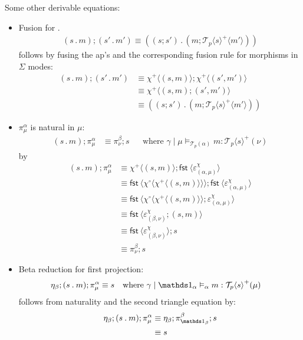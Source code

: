 \documentclass[10pt]{article}
\theoremstyle{definition}
\newcommand\dsd[1]{\ensuremath{\mathsf{#1}}}
\newcommand{\app}[2]{\ensuremath{#1 \: #2}}
\newcommand{\fst}[1]{\app{\dsd{fst}}{#1}}
\newcommand\TermTwoT[5]{\ensuremath{#1 \mid #3 \vDash_{#5} {#2} : #4}}
\newcommand\TrPlus[2]{\ensuremath{{#1}^+(#2)}}
\newcommand\El[2]{\mathcal{T}_{#1}(#2)}
\newcommand\ApEl[2]{\mathcal{T}_{#1}\langle#2\rangle}
\newcommand\bdot[0]{\mathbin{.}}
\newcommand\ap[2]{\ensuremath{#1 \langle #2 \rangle }}
\newcommand\ApPlus[2]{\ensuremath{{#1}^+ \langle #2 \rangle }}
\newcommand\ApCirc[2]{\ensuremath{{#1}^\circ \langle #2 \rangle }}
\begin{document}
Some other derivable equations:
\begin{itemize}
\item Fusion for $.$
\begin{align}
\label{dot-fusion}
    (s \bdot m);(s' \bdot m') \equiv ((s;s') \bdot (m;\ApPlus{\ApEl{p}{s}} {m'}))
\end{align}
follows by fusing the ap's and the corresponding fusion rule for morphisms in $\Sigma$ modes:
\begin{align*}
(s \bdot m);(s' \bdot m') &\equiv \ApPlus{\chi}{(s, m)} ; \ApPlus{\chi}{(s', m')} \\
&\equiv \ApPlus{\chi}{(s, m);(s', m')} \\
&\equiv ((s;s') \bdot (m;\ApPlus{\ApEl{p}{s}} {m'}))
\end{align*}

\item $\pi^\alpha_\mu$ is natural in $\mu$:
  \begin{align}
  \label{pi-naturality}
  (s \bdot m); \pi^\alpha_\mu &\equiv \pi^\beta_\nu;s && \text{where } \TermTwoT{\gamma}{m}{\mu}{\TrPlus{\ApEl{p}{s}}{\nu}}{\El{p}{\alpha}}
  \end{align}
  by
  \begin{align*}
  (s \bdot m); \pi^\alpha_\mu 
  &\equiv \ApPlus{\chi}{(s, m)} ; \ap \fst {\varepsilon^\chi_{(\alpha, \mu)}} \\  
  &\equiv \ap{\fst}{\ApCirc{\chi}{\ApPlus{\chi}{(s, m)}}} ; \ap \fst {\varepsilon^\chi_{(\alpha, \mu)}} \\
  &\equiv \ap{\fst}{\ApCirc{\chi}{\ApPlus{\chi}{(s, m)}} ; \varepsilon^\chi_{(\alpha, \mu)}}  \\
  &\equiv \ap{\fst}{\varepsilon^\chi_{(\beta, \nu)}; (s, m) } \\
  &\equiv \ap{\fst}{\varepsilon^\chi_{(\beta, \nu)}} ; s\\
  &\equiv \pi^\beta_\nu ; s
  \end{align*}

\item Beta reduction for first projection:
  \begin{align}
\label{beta-pi}
\eta_\beta;(s \bdot m);\pi^\alpha_\mu &\equiv s && \text{where } \TermTwoT{\gamma}{m}{\One_\alpha}{\TrPlus{\ApEl{p}{s}}{\mu}}{\alpha}
  \end{align}
follows from naturality and the second triangle equation by:
\begin{align*}
\eta_\beta;(s \bdot m);\pi^\alpha_\mu
&\equiv \eta_\beta;\pi^\beta_{\One_\beta};s \\
&\equiv s
\end{align*}


\end{itemize}
\end{document}
